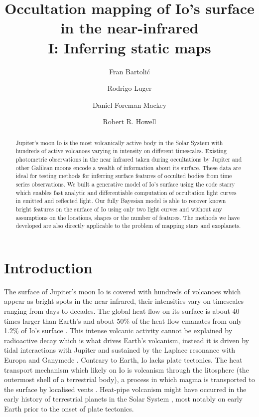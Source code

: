 \documentclass[modern]{aastex62}
\begin{document}
\title{
    \vspace{-3em}
\textbf{    Occultation mapping of Io's surface in the near-infrared \\ I: Inferring static maps} 
}
\author{Fran Bartoli\'c}
\author{Rodrigo Luger}
\author{Daniel Foreman-Mackey}
\author{Robert R. Howell}
%

\begin{abstract}
Jupiter's moon Io is the most volcanically active body in the Solar System with hundreds of active volcanoes varying in intensity on different timescales.
Existing photometric observations in the near infrared taken during occultations by Jupiter and other Galilean moons encode a wealth of information about its surface.
These data are ideal for testing methods for inferring surface features of occulted bodies from time series observations.
We built a generative model of Io's surface using the code starry \href{https://rodluger.github.io/starry/}{\color{linkcolor}\faGithub} which enables fast analytic and differentiable computation of occultation light curves in emitted and reflected light.
    Our fully Bayesian model is able to recover known bright features on the surface of Io using only two light curves and without any assumptions on the locations, shapes or the number of features.
    The methods we have developed are also directly applicable to the problem of mapping stars and exoplanets.\href{https://github.com/fbartolic/volcano}{\color{linkcolor}\faGithub}
\end{abstract}

%
\section{Introduction}
The surface of Jupiter's moon Io is covered with hundreds of volcanoes which appear as bright spots in the near infrared, their intensities vary on timescales ranging from days to decades.
The global heat flow on its surface is about 40 times larger than Earth's \citep{breuer2007,davies2010}
and about 50\% of the heat flow emanates from only 1.2\% of Io's surface \citep{veeder2012}.
This intense volcanic activity cannot be explained by radioactive decay which is what drives Earth's volcanism, instead it is driven by tidal interactions with Jupiter and sustained by the Laplace resonance with Europa and Ganymede \citep{peale1979}.
Contrary to Earth, Io lacks plate tectonics.
The heat transport mechanism which likely on Io is volcanism through the litosphere (the outermost shell of a terrestrial body), a process in which magma is transported to the surface by localised vents \cite{oreilly1981}.
Heat-pipe volcanism might have occurred in the early history of terrestrial planets in the Solar System \cite{moore2013,moore2017}, most notably on early Earth prior to the onset of plate tectonics.
\end{document}
